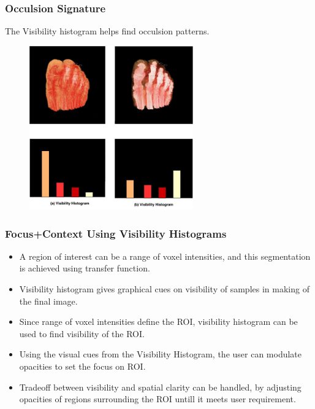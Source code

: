 \documentclass{beamer}
\begin{document}


\begin{frame}
\frametitle{Occulsion Signature}
The Visibility histogram helps find occulsion patterns.
\begin{figure}
\centering
\includegraphics[width=200pt]{occlusion.jpg}
\end{figure}
\end{frame}



\begin{frame}
\frametitle{Focus+Context Using Visibility Histograms}
\begin{itemize}
\item A region of interest can be a range of voxel intensities, and this segmentation is achieved using transfer function.
\item Visibility histogram gives graphical cues on visibility of samples in making of the final image.
\item Since range of voxel intensities define the ROI, visibility histogram can be used to find visibility of the ROI.
\item Using the visual cues from the Visibility Histogram, the user can modulate opacities to set the focus on ROI. 
\item Tradeoff between visibility and spatial clarity can be handled, by adjusting opacities of regions surrounding the ROI untill it meets user requirement.
\end{itemize}
\end{frame}


\end{document}
